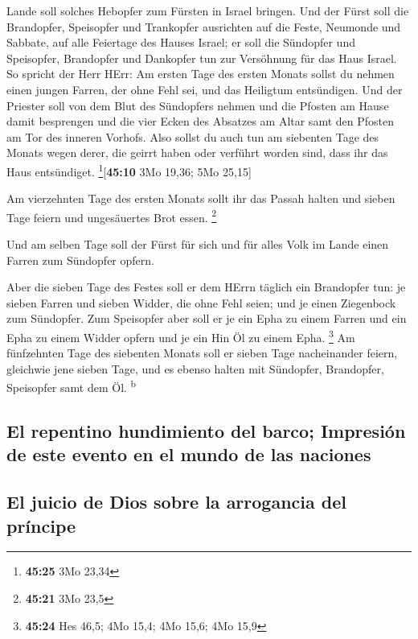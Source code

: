 Lande soll solches Hebopfer zum Fürsten in Israel bringen.
 Und der Fürst soll die Brandopfer, Speisopfer und
Trankopfer ausrichten auf die Feste, Neumonde und Sabbate, auf alle
Feiertage des Hauses Israel; er soll die Sündopfer und Speisopfer,
Brandopfer und Dankopfer tun zur Versöhnung für das Haus Israel.
 So spricht der Herr HErr: Am ersten Tage des ersten
Monats sollst du nehmen einen jungen Farren, der ohne Fehl sei, und das
Heiligtum entsündigen.  Und der Priester soll von dem
Blut des Sündopfers nehmen und die Pfosten am Hause damit besprengen und
die vier Ecken des Absatzes am Altar samt den Pfosten am Tor des inneren
Vorhofs.  Also sollst du auch tun am siebenten Tage des
Monats wegen derer, die geirrt haben oder verführt worden sind, dass ihr
das Haus entsündiget. \footnote{\textbf{45:25} 3Mo 23,34}{[}\textbf{45:10}
3Mo 19,36; 5Mo 25,15{]}

 Am vierzehnten Tage des ersten Monats sollt ihr das
Passah halten und sieben Tage feiern und ungesäuertes Brot essen.
\footnote{\textbf{45:21} 3Mo 23,5}

 Und am selben Tage soll der Fürst für sich und für alles
Volk im Lande einen Farren zum Sündopfer opfern.

 Aber die sieben Tage des Festes soll er dem HErrn
täglich ein Brandopfer tun: je sieben Farren und sieben Widder, die ohne
Fehl seien; und je einen Ziegenbock zum Sündopfer.  Zum
Speisopfer aber soll er je ein Epha zu einem Farren und ein Epha zu
einem Widder opfern und je ein Hin Öl zu einem Epha. \footnote{\textbf{45:24}
  Hes 46,5; 4Mo 15,4; 4Mo 15,6; 4Mo 15,9}  Am fünfzehnten
Tage des siebenten Monats soll er sieben Tage nacheinander feiern,
gleichwie jene sieben Tage, und es ebenso halten mit Sündopfer,
Brandopfer, Speisopfer samt dem Öl. \textsuperscript{b}

\hypertarget{el-repentino-hundimiento-del-barco-impresiuxf3n-de-este-evento-en-el-mundo-de-las-naciones}{%
\subsection{El repentino hundimiento del barco; Impresión de este evento
en el mundo de las
naciones}\label{el-repentino-hundimiento-del-barco-impresiuxf3n-de-este-evento-en-el-mundo-de-las-naciones}}

\hypertarget{el-juicio-de-dios-sobre-la-arrogancia-del-pruxedncipe}{%
\subsection{El juicio de Dios sobre la arrogancia del
príncipe}\label{el-juicio-de-dios-sobre-la-arrogancia-del-pruxedncipe}}

